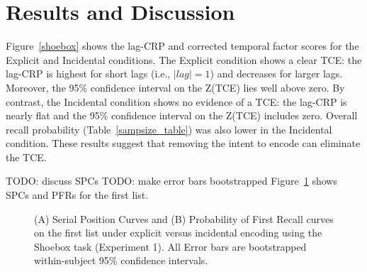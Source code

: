 \documentclass[jou,natbib,floatsintext]{apa6} %
\begin{document}
\section{Results and Discussion}

Figure~\ref{shoebox} shows the lag-CRP and corrected temporal factor scores for the Explicit and Incidental conditions. The Explicit condition shows a clear TCE: the lag-CRP is highest for short lags (i.e., $|lag|=1$) and decreases for larger lags. Moreover, the 95\% confidence interval on the Z(TCE) lies well above zero. By contrast, the Incidental condition shows no evidence of a TCE: the lag-CRP is nearly flat and the 95\% confidence interval on the Z(TCE) includes zero. Overall recall probability (Table~\ref{sampsize_table}) was also lower in the Incidental condition. These results suggest that removing the intent to encode can eliminate the TCE.


\newcommand\paneltext{(A) Lag-conditional response probability functions. Error bars are bootstrapped within-subject 95\% confidence intervals. (B) The average Z(TCE).  Error bars are bootstrapped between-subject 95\% confidence intervals. Z(TCE) for a given subject is computed as follows: An observed temporal factor score was computed as the average percentile ranking the temporal lag of each actual transition in the recall sequence with respect to the lags of all transitions that were possible at that time. To determine the temporal factor score expected by chance, a permutation distribution was created by randomly shuffling the order of recalls within the sequence 10,000 times and computing a temporal factor score for each shuffling. The reported value, Z(TCE), is z-score of the observed temporal factor score within the permutation distribution.}
\begin{figure*}
\caption{The temporal contiguity effect (TCE) on the first list under explicit versus incidental encoding using the Shoebox task (Experiment 1). \paneltext}
\label{shoebox}
\end{figure*}



TODO: discuss SPCs
TODO: make error bars bootstrapped
\color{red}
Figure~\ref{e1_l1_spc} shows SPCs and PFRs for the first list.

\newcommand\spcpaneltext{All Error bars are bootstrapped within-subject 95\% confidence intervals.}
\begin{figure}
\caption{(A) Serial Position Curves and (B) Probability of First Recall curves on the first list under explicit versus incidental encoding using the Shoebox task (Experiment 1). \spcpaneltext}
\label{e1_l1_spc}
\end{figure}
\end{document}
